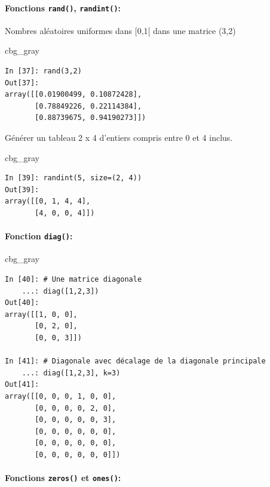\documentclass[%
oneside,                 %
final,                   %
10pt,french]{article}
\newenvironment{_cod_tight}[1]{
   \def\FrameCommand{\colorbox{#1}}
   \FrameRule0.6pt\MakeFramed {\FrameRestore}\vskip3mm}
   {\vskip0mm\endMakeFramed}
\newenvironment{cod}[1]{
\bgroup\rmfamily
\fboxsep=0mm\relax
\begin{_cod_tight}{#1}
\list{}{\parsep=-2mm\parskip=0mm\topsep=0pt\leftmargin=2mm
\rightmargin=2\leftmargin\leftmargin=4pt\relax}
\item\relax}
{\endlist\end{_cod_tight}\egroup}
\begin{document}
\paragraph{Fonctions \texttt{rand()}, \texttt{randint()}:}

Nombres aléatoires uniformes dans [0,1[ dans une matrice (3,2)
\begin{cod}{cbg_gray}\begin{verbatim}
In [37]: rand(3,2)
Out[37]:
array([[0.01900499, 0.10872428],
       [0.78849226, 0.22114384],
       [0.88739675, 0.94190273]])
\end{verbatim}
\end{cod}
\noindent

Générer un tableau 2 x 4 d'entiers compris entre 0 et 4 inclus.
\begin{cod}{cbg_gray}\begin{verbatim}
In [39]: randint(5, size=(2, 4))
Out[39]:
array([[0, 1, 4, 4],
       [4, 0, 0, 4]])
\end{verbatim}
\end{cod}
\noindent

\paragraph{Fonction \texttt{diag()}:}

\begin{cod}{cbg_gray}\begin{verbatim}
In [40]: # Une matrice diagonale
    ...: diag([1,2,3])
Out[40]:
array([[1, 0, 0],
       [0, 2, 0],
       [0, 0, 3]])

In [41]: # Diagonale avec décalage de la diagonale principale
    ...: diag([1,2,3], k=3)
Out[41]:
array([[0, 0, 0, 1, 0, 0],
       [0, 0, 0, 0, 2, 0],
       [0, 0, 0, 0, 0, 3],
       [0, 0, 0, 0, 0, 0],
       [0, 0, 0, 0, 0, 0],
       [0, 0, 0, 0, 0, 0]])
\end{verbatim}
\end{cod}
\noindent

\paragraph{Fonctions \texttt{zeros()} et \texttt{ones()}:}
\end{document}
